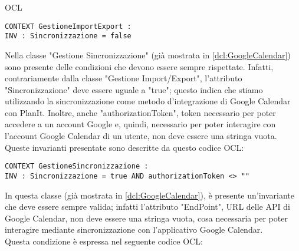 \begin{listaPersonale}{OCL}
    \begin{lstlisting}
CONTEXT GestioneImportExport :
INV : Sincronizzazione = false
    \end{lstlisting}
    \newpage


        \begin{center}
            
        \end{center}
        Nella classe "Gestione Sincronizzazione" (già mostrata in \ref{dcl:GoogleCalendar}) sono presente delle condizioni che devono essere sempre rispettate. Infatti, contrariamente dalla classe "Gestione Import/Export", l'attributo "Sincronizzazione" deve essere uguale a "true"; questo indica che stiamo utilizzando la sincronizzazione come metodo d'integrazione di Google Calendar con PlanIt.
        Inoltre, anche "authorizationToken", token necessario per poter accedere a un account Google e, quindi, necessario per poter interagire con l'account Google Calendar di un utente, non deve essere una stringa vuota.\\
        Queste invarianti presentate sono descritte da questo codice OCL:
        \begin{lstlisting}
CONTEXT GestioneSincronizzazione :
INV : Sincronizzazione = true AND authorizationToken <> ""
    \end{lstlisting}



        \begin{center}
            
        \end{center}
        In questa classe (già mostrata in \ref{dcl:GoogleCalendar}), è presente un'invariante che deve essere sempre valida; infatti l'attributo "EndPoint", URL delle API di Google Calendar, non deve essere una stringa vuota, cosa necessaria per poter interagire mediante sincronizzazione con l'applicativo Google Calendar.\\
        Questa condizione è espressa nel seguente codice OCL:


\end{listaPersonale}
